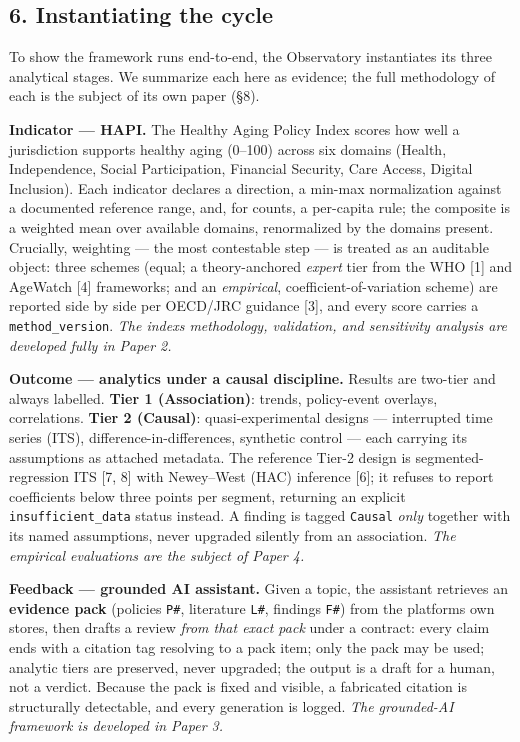 \documentclass[
  11pt,
]{article}
\begin{document}
\hypertarget{6-instantiating-the-cycle}{%
\subsection{6. Instantiating the
cycle}\label{6-instantiating-the-cycle}}

To show the framework runs end-to-end, the Observatory instantiates its
three analytical stages. We summarize each here as evidence; the full
methodology of each is the subject of its own paper (§8).

\textbf{Indicator --- HAPI.} The Healthy Aging Policy Index scores how
well a jurisdiction supports healthy aging (0--100) across six domains
(Health, Independence, Social Participation, Financial Security, Care
Access, Digital Inclusion). Each indicator declares a direction, a
min-max normalization against a documented reference range, and, for
counts, a per-capita rule; the composite is a weighted mean over
available domains, renormalized by the domains present. Crucially,
weighting --- the most contestable step --- is treated as an auditable
object: three schemes (equal; a theory-anchored \emph{expert} tier from
the WHO {[}1{]} and AgeWatch {[}4{]} frameworks; and an
\emph{empirical}, coefficient-of-variation scheme) are reported side by
side per OECD/JRC guidance {[}3{]}, and every score carries a
\texttt{method\_version}. \emph{The index\textquotesingle s methodology,
validation, and sensitivity analysis are developed fully in Paper 2.}

\textbf{Outcome --- analytics under a causal discipline.} Results are
two-tier and always labelled. \textbf{Tier 1 (Association)}: trends,
policy-event overlays, correlations. \textbf{Tier 2 (Causal)}:
quasi-experimental designs --- interrupted time series (ITS),
difference-in-differences, synthetic control --- each carrying its
assumptions as attached metadata. The reference Tier-2 design is
segmented-regression ITS {[}7, 8{]} with Newey--West (HAC) inference
{[}6{]}; it refuses to report coefficients below three points per
segment, returning an explicit \texttt{insufficient\_data} status
instead. A finding is tagged \texttt{Causal} \emph{only} together with
its named assumptions, never upgraded silently from an association.
\emph{The empirical evaluations are the subject of Paper 4.}

\textbf{Feedback --- grounded AI assistant.} Given a topic, the
assistant retrieves an \textbf{evidence pack} (policies \texttt{P\#},
literature \texttt{L\#}, findings \texttt{F\#}) from the
platform\textquotesingle s own stores, then drafts a review \emph{from
that exact pack} under a contract: every claim ends with a citation tag
resolving to a pack item; only the pack may be used; analytic tiers are
preserved, never upgraded; the output is a draft for a human, not a
verdict. Because the pack is fixed and visible, a fabricated citation is
structurally detectable, and every generation is logged. \emph{The
grounded-AI framework is developed in Paper 3.}
\end{document}
